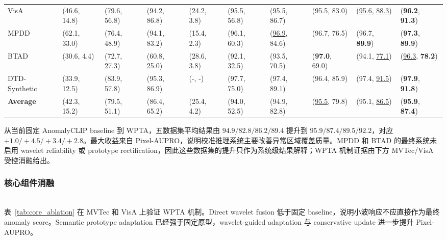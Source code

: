 \documentclass[runningheads]{llncs}
\begin{document}
\begin{table}[htbp]
{\begin{tabular}{llllllllll}
      VisA & (46.6, 14.8) & (79.6, 56.8) & (94.2, 86.8) & (24.2, 3.8) & (95.5, 56.8) & (95.5, 86.7) & (95.5, 83.0) & (\underline{95.6}, \underline{88.3}) & (\textbf{96.2}, \textbf{91.3}) \\
      MPDD & (62.1, 33.0) & (76.4, 48.9) & (94.1, 83.2) & (15.4, 2.3) & (96.1, 60.3) & (\underline{96.9}, 84.6) & (96.7, 76.5) & (96.7, \textbf{89.9}) & (\textbf{97.3}, \textbf{89.9}) \\
      BTAD & (30.6, 4.4) & (72.7, 27.3) & (60.8, 25.0) & (28.6, 3.8) & (92.1, 32.5) & (93.5, 70.5) & (\textbf{97.0}, 69.0) & (94.1, \underline{77.1}) & (\underline{96.3}, \textbf{78.2}) \\
      DTD-Synthetic & (33.9, 12.5) & (83.9, 57.8) & (95.3, 86.9) & (-, -) & (97.7, 75.0) & (97.4, 89.1) & (96.4, 85.9) & (97.4, \underline{91.5}) & (\textbf{97.9}, \textbf{91.8}) \\
      \midrule
      \textbf{Average} & (42.3, 15.2) & (79.5, 51.1) & (86.4, 65.2) & (25.4, 4.2) & (94.0, 52.5) & (94.9, 82.8) & (\underline{95.5}, 79.8) & (95.1, \underline{86.5}) & (\textbf{95.9}, \textbf{87.4}) \\
      \bottomrule
    \end{tabular}%
  }
\end{table}

从当前固定 AnomalyCLIP baseline 到 WPTA，五数据集平均结果由 $94.9/82.8/86.2/89.4$ 提升到 $95.9/87.4/89.5/92.2$，对应 $+1.0/+4.5/+3.4/+2.8$。最大收益来自 Pixel-AUPRO，说明校准推理系统主要改善异常区域覆盖质量。MPDD 和 BTAD 的最终系统未启用 wavelet reliability 或 prototype rectification，因此这些数据集的提升只作为系统级结果解释；WPTA 机制证据由下方 MVTec/VisA 受控消融给出。

\subsubsection{核心组件消融}
\mbox{}\\
\noindent
表~\ref{tab:core_ablation} 在 MVTec 和 VisA 上验证 WPTA 机制。Direct wavelet fusion 低于固定 baseline，说明小波响应不应直接作为最终 anomaly score。Semantic prototype adaptation 已经强于固定原型，wavelet-guided adaptation 与 conservative update 进一步提升 Pixel-AUPRO。
\end{document}
